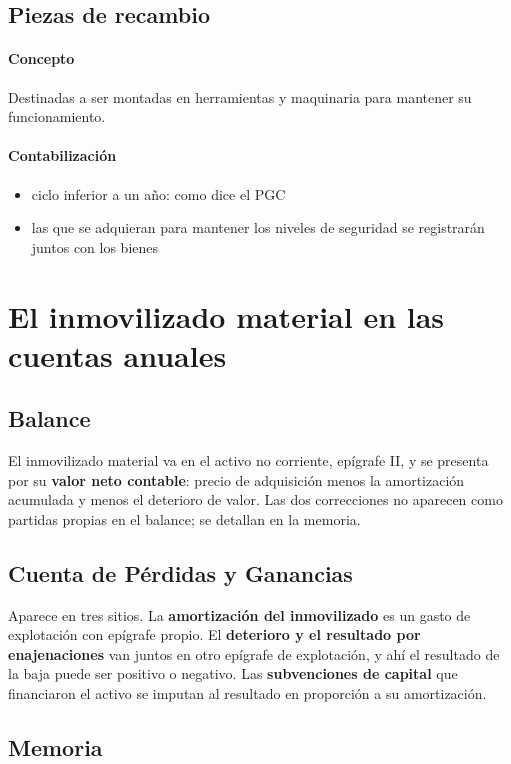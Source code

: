 \documentclass[a4paper,12pt]{article}
\begin{document}
\subsection*{Piezas de recambio}
\paragraph{Concepto}
Destinadas a ser montadas en herramientas y maquinaria para mantener su funcionamiento.

\paragraph{Contabilización}
\begin{itemize}
    \item ciclo inferior a un año: como dice el PGC
    \item las que se adquieran para mantener los niveles de seguridad se registrarán juntos con los bienes
\end{itemize}

\section{El inmovilizado material en las cuentas anuales}
\subsection{Balance}
El inmovilizado material va en el activo no corriente, epígrafe II, y se presenta
por su \textbf{valor neto contable}: precio de adquisición menos la amortización
acumulada y menos el deterioro de valor. Las dos correcciones no aparecen como
partidas propias en el balance; se detallan en la memoria.

\subsection{Cuenta de Pérdidas y Ganancias}
Aparece en tres sitios. La \textbf{amortización del inmovilizado} es un gasto de
explotación con epígrafe propio. El \textbf{deterioro y el resultado por
enajenaciones} van juntos en otro epígrafe de explotación, y ahí el resultado de
la baja puede ser positivo o negativo. Las \textbf{subvenciones de capital} que
financiaron el activo se imputan al resultado en proporción a su amortización.
\subsection{Memoria}
\end{document}
